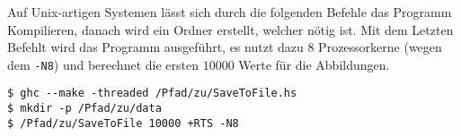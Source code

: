 Auf Unix-artigen Systemen lässt sich durch die folgenden Befehle das Programm
Kompilieren, danach wird ein Ordner erstellt, welcher nötig ist. Mit dem
Letzten Befehlt wird das Programm ausgeführt, es nutzt dazu 8 Prozessorkerne
(wegen dem \texttt{-N8}) und berechnet die ersten $10000$ Werte für die
Abbildungen.
\begin{lstlisting}[style=Bash]
$ ghc --make -threaded /Pfad/zu/SaveToFile.hs
$ mkdir -p /Pfad/zu/data
$ /Pfad/zu/SaveToFile 10000 +RTS -N8
\end{lstlisting}


